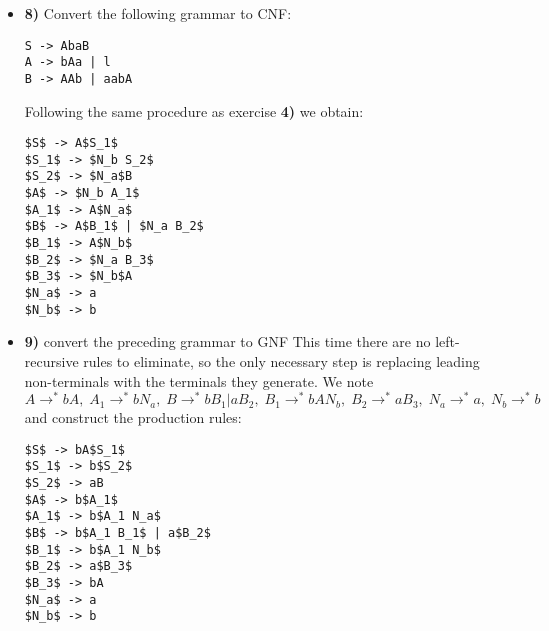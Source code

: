 \documentclass[defaultpackages]{simplereport}
\newcommand{\gen}{\rightarrow^*}
\begin{document}
\begin{itemize}[label=]
   \item \textbf{8)} Convert the following grammar to CNF:
     \begin{lstlisting}
S -> AbaB
A -> bAa | l
B -> AAb | aabA
\end{lstlisting}
     Following the same procedure as exercise \textbf{4)} we obtain:
     \begin{lstlisting}
$S$ -> A$S_1$
$S_1$ -> $N_b S_2$
$S_2$ -> $N_a$B
$A$ -> $N_b A_1$
$A_1$ -> A$N_a$
$B$ -> A$B_1$ | $N_a B_2$
$B_1$ -> A$N_b$
$B_2$ -> $N_a B_3$
$B_3$ -> $N_b$A
$N_a$ -> a
$N_b$ -> b
\end{lstlisting}

   \item \textbf{9)} convert the preceding grammar to GNF
     This time there are no left-recursive rules to eliminate, so the only
     necessary step is replacing leading non-terminals with the terminals they
     generate. We note $A \gen bA, \; A_1 \gen bN_a, \;B \gen bB_1 | aB_2,\; B_1 \gen
     bAN_b, \;B_2 \gen aB_3,\; N_a \gen a, \; N_b \gen b$ and construct the production rules:
     \begin{lstlisting}
$S$ -> bA$S_1$
$S_1$ -> b$S_2$
$S_2$ -> aB
$A$ -> b$A_1$
$A_1$ -> b$A_1 N_a$
$B$ -> b$A_1 B_1$ | a$B_2$
$B_1$ -> b$A_1 N_b$
$B_2$ -> a$B_3$
$B_3$ -> bA
$N_a$ -> a
$N_b$ -> b
\end{lstlisting}
   \end{itemize}
\end{document}
